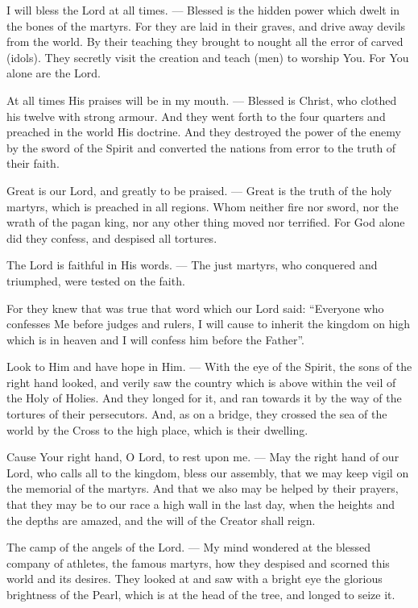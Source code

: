 \documentclass[12pt,twoside,a5paper]{article}
\begin{document}

\begin{halfparskip}
  I will bless the Lord at all times. --- Blessed is the hidden power which dwelt in the bones of the martyrs. For they are laid in their graves, and drive away devils from the world. By their teaching they brought to nought all the error of carved (idols). They secretly visit the creation and teach (men) to worship You. For You alone are the Lord.

  At all times His praises will be in my mouth. --- Blessed is Christ, who clothed his twelve with strong armour. And they went forth to the four quarters and preached in the world His doctrine. And they destroyed the power of the enemy by the sword of the Spirit and converted the nations from error to the truth of their faith.

  Great is our Lord, and greatly to be praised. --- Great is the truth of the holy martyrs, which is preached in all regions. Whom neither fire nor sword, nor the wrath of the pagan king, nor any other thing moved nor terrified. For God alone did they confess, and despised all tortures.

  The Lord is faithful in His words. --- The just martyrs, who conquered and triumphed, were tested on the faith.

  For they knew that was true that word which our Lord said: ``Everyone who confesses Me before judges and rulers, I will cause to inherit the kingdom on high which is in heaven and I will confess him before the Father''.

  Look to Him and have hope in Him. --- With the eye of the Spirit, the sons of the right hand looked, and verily saw the country which is above within the veil of the Holy of Holies. And they longed for it, and ran towards it by the way of the tortures of their persecutors. And, as on a bridge, they crossed the sea of the world by the Cross to the high place, which is their dwelling.

  Cause Your right hand, O Lord, to rest upon me. --- May the right hand of our Lord, who calls all to the kingdom, bless our assembly, that we may keep vigil on the memorial of the martyrs. And that we also may be helped by their prayers, that they may be to our race a high wall in the last day, when the heights and the depths are amazed, and the will of the Creator shall reign.

  The camp of the angels of the Lord. --- My mind wondered at the blessed company of athletes, the famous martyrs, how they despised and scorned this world and its desires. They looked at and saw with a bright eye the glorious brightness of the Pearl, which is at the head of the tree, and longed to seize it.


\end{halfparskip}
\end{document}

